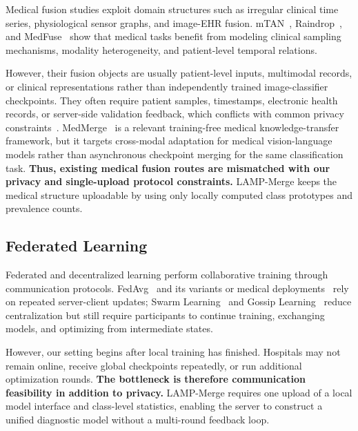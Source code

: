 \documentclass[letterpaper]{article} %
\begin{document}
Medical fusion studies exploit domain structures such as irregular clinical time series, physiological sensor graphs, and image-EHR fusion. mTAN~\cite{shukla2021multitimeattentionnetworksirregularly}, Raindrop~\cite{zhang2022graphguidednetworkirregularlysampled}, and MedFuse~\cite{hayat2023medfusemultimodalfusionclinical} show that medical tasks benefit from modeling clinical sampling mechanisms, modality heterogeneity, and patient-level temporal relations.

However, their fusion objects are usually patient-level inputs, multimodal records, or clinical representations rather than independently trained image-classifier checkpoints. They often require patient samples, timestamps, electronic health records, or server-side validation feedback, which conflicts with common privacy constraints~\cite{kaissis2020secure,sheller2020federated,bonawitz2019towards}. MedMerge~\cite{11382027} is a relevant training-free medical knowledge-transfer framework, but it targets cross-modal adaptation for medical vision-language models rather than asynchronous checkpoint merging for the same classification task. \textbf{Thus, existing medical fusion routes are mismatched with our privacy and single-upload protocol constraints.} LAMP-Merge keeps the medical structure uploadable by using only locally computed class prototypes and prevalence counts.

\subsection{Federated Learning}

Federated and decentralized learning perform collaborative training through communication protocols. FedAvg~\cite{pmlr-v54-mcmahan17a} and its variants or medical deployments~\cite{li2020fedprox,karimireddy2020scaffold,li2021fedbn,kaissis_secure_2020,sheller2020federated,rieke2020future,kairouz2021advances} rely on repeated server-client updates; Swarm Learning~\cite{warnat-herresthal_swarm_2021} and Gossip Learning~\cite{hegedhus_gossip_2019} reduce centralization but still require participants to continue training, exchanging models, and optimizing from intermediate states.

However, our setting begins after local training has finished. Hospitals may not remain online, receive global checkpoints repeatedly, or run additional optimization rounds. \textbf{The bottleneck is therefore communication feasibility in addition to privacy.} LAMP-Merge requires one upload of a local model interface and class-level statistics, enabling the server to construct a unified diagnostic model without a multi-round feedback loop.
\end{document}
